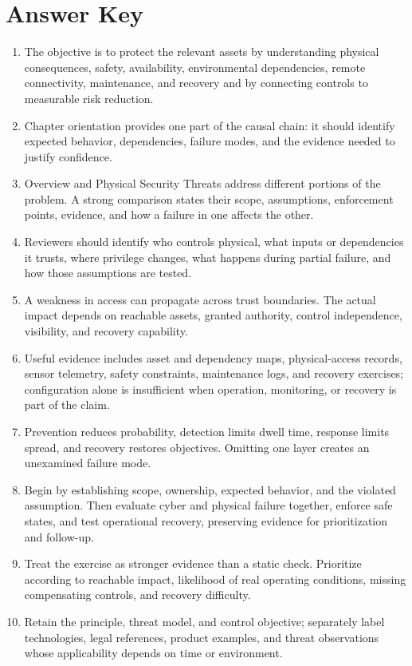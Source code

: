 \documentclass[11pt,letterpaper]{article}
\begin{document}
\section*{Answer Key}
\begin{enumerate}
\item The objective is to protect the relevant assets by understanding physical consequences, safety, availability, environmental dependencies, remote connectivity, maintenance, and recovery and by connecting controls to measurable risk reduction.
\item Chapter orientation provides one part of the causal chain: it should identify expected behavior, dependencies, failure modes, and the evidence needed to justify confidence.
\item Overview and Physical Security Threats address different portions of the problem. A strong comparison states their scope, assumptions, enforcement points, evidence, and how a failure in one affects the other.
\item Reviewers should identify who controls physical, what inputs or dependencies it trusts, where privilege changes, what happens during partial failure, and how those assumptions are tested.
\item A weakness in access can propagate across trust boundaries. The actual impact depends on reachable assets, granted authority, control independence, visibility, and recovery capability.
\item Useful evidence includes asset and dependency maps, physical-access records, sensor telemetry, safety constraints, maintenance logs, and recovery exercises; configuration alone is insufficient when operation, monitoring, or recovery is part of the claim.
\item Prevention reduces probability, detection limits dwell time, response limits spread, and recovery restores objectives. Omitting one layer creates an unexamined failure mode.
\item Begin by establishing scope, ownership, expected behavior, and the violated assumption. Then evaluate cyber and physical failure together, enforce safe states, and test operational recovery, preserving evidence for prioritization and follow-up.
\item Treat the exercise as stronger evidence than a static check. Prioritize according to reachable impact, likelihood of real operating conditions, missing compensating controls, and recovery difficulty.
\item Retain the principle, threat model, and control objective; separately label technologies, legal references, product examples, and threat observations whose applicability depends on time or environment.
\end{enumerate}
\end{document}

